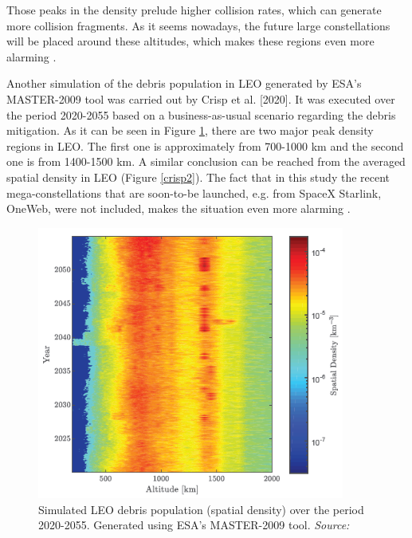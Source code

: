 Those peaks in the density prelude higher collision rates, which can generate more collision fragments. As it seems nowadays, the future large constellations will be placed around these altitudes, which makes these regions even more alarming \cite{Somma 2019}.

Another simulation of the debris population in LEO generated by ESA's MASTER-2009 tool was carried out by Crisp et al. [2020]. It was executed over the period 2020-2055 based on a business-as-usual scenario regarding the debris mitigation. As it can be seen in Figure \ref{crisp1}, there are two major peak density regions in LEO. The first one is approximately from 700-1000 km and the second one is from 1400-1500 km. A similar conclusion can be reached from the averaged spatial density in LEO (Figure \ref{crisp2}). The fact that in this study the recent mega-constellations that are soon-to-be launched, e.g. from SpaceX Starlink, OneWeb, were not included, makes the situation even more alarming \cite{Crisp 2020}.

\begin{figure}[!htb]
\centering
\includegraphics[width=0.9\textwidth]{Images/crisp1.png}\caption{Simulated LEO debris population (spatial density) over the period 2020-2055. Generated using ESA's MASTER-2009 tool. \textit{Source: \cite{Crisp 2020}}}
\label{crisp1} 
\end{figure}

